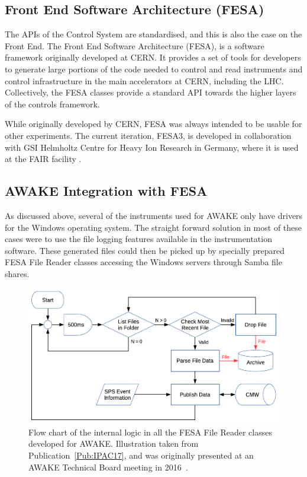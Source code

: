 \subsection{Front End Software Architecture (FESA)}
\label{DAQ:FESA}

The APIs of the Control System are standardised, and this is also the case on the Front End.
The Front End Software Architecture (FESA), is a software framework originally developed at CERN.
It provides a set of tools for developers to generate large portions of the code needed to control and read instruments and control infrastructure in the main accelerators at CERN, including the LHC.
Collectively, the FESA classes provide a standard API towards the higher layers of the controls framework.

While originally developed by CERN, FESA was always intended to be usable for other experiments.
The current iteration, FESA3, is developed in collaboration with GSI Helmholtz Centre for Heavy Ion Research in Germany, where it is used at the FAIR facility \cite{schwinn:2010}.

\subsection{AWAKE Integration with FESA}
\label{DAQ:Integration}

As discussed above, several of the instruments used for AWAKE only have drivers for the Windows operating system.
The straight forward solution in most of these cases were to use the file logging features available in the instrumentation software.
These generated files could then be picked up by specially prepared FESA File Reader classes accessing the Windows servers through Samba file shares.

\begin{figure}[hbt]
    \centering
    \includegraphics[width=0.85\linewidth,trim={0mm 0mm 0mm 0mm},clip]{figures/FileReader}
    \caption{\label{Fig:DAQ:Reader}
        Flow chart of the internal logic in all the FESA File Reader classes developed for AWAKE.
        Illustration taken from Publication~\ref{Pub:IPAC17}, and was originally presented at an AWAKE Technical Board meeting in 2016~\cite{add:berglyd_olsen:2016}.
    }
\end{figure}


